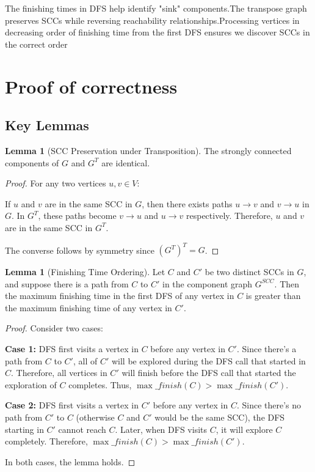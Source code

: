 \documentclass{book}
\theoremstyle{definition}
\newtheorem{lemma}[definition]{Lemma}
\begin{document}
The finishing times in DFS help identify "sink" components.The transpose graph preserves SCCs while reversing reachability relationships.Processing vertices in decreasing order of finishing time from the first DFS ensures we discover SCCs in the correct order

\section{Proof of correctness}
\subsection{Key Lemmas}

\begin{lemma}[SCC Preservation under Transposition]
The strongly connected components of $G$ and $G^T$ are identical.
\end{lemma}

\begin{proof}
For any two vertices $u, v \in V$:

If $u$ and $v$ are in the same SCC in $G$, then there exists paths $u \to v$ and $v \to u$ in $G$. In $G^T$, these paths become $v \to u$ and $u \to v$ respectively. Therefore, $u$ and $v$ are in the same SCC in $G^T$.

The converse follows by symmetry since $(G^T)^T = G$.
\end{proof}

\begin{lemma}[Finishing Time Ordering]
Let $C$ and $C'$ be two distinct SCCs in $G$, and suppose there is a path from $C$ to $C'$ in the component graph $G^{SCC}$. Then the maximum finishing time in the first DFS of any vertex in $C$ is greater than the maximum finishing time of any vertex in $C'$.
\end{lemma}

\begin{proof}
Consider two cases:

\textbf{Case 1:} DFS first visits a vertex in $C$ before any vertex in $C'$. Since there's a path from $C$ to $C'$, all of $C'$ will be explored during the DFS call that started in $C$. Therefore, all vertices in $C'$ will finish before the DFS call that started the exploration of $C$ completes. Thus, $\max\_finish(C) > \max\_finish(C')$.

\textbf{Case 2:} DFS first visits a vertex in $C'$ before any vertex in $C$. Since there's no path from $C'$ to $C$ (otherwise $C$ and $C'$ would be the same SCC), the DFS starting in $C'$ cannot reach $C$. Later, when DFS visits $C$, it will explore $C$ completely. Therefore, $\max\_finish(C) > \max\_finish(C')$.

In both cases, the lemma holds.
\end{proof}
\end{document}
